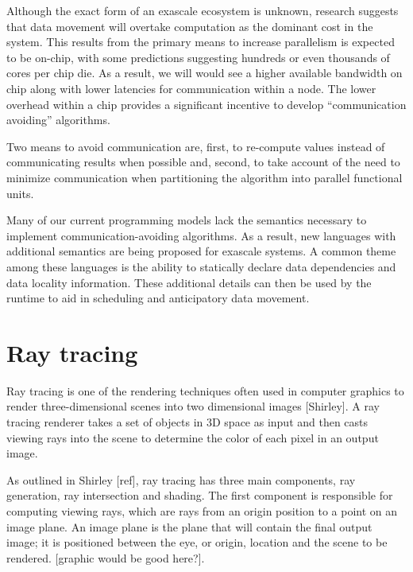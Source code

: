 Although the exact form of an exascale ecosystem is unknown, research
suggests that data movement will overtake computation as the dominant
cost in the system.
This results from the primary means to increase parallelism is
expected to be on-chip, with some predictions
suggesting hundreds or even thousands of cores
per chip die.
As a result, we will would see a higher available bandwidth on
chip along with lower latencies for communication within a node.
The
lower overhead within a chip provides a significant incentive to
develop ``communication avoiding'' algorithms.

Two means to avoid communication are, first, to re-compute values
instead of communicating results when possible and, second, to take
account of the need to minimize communication when partitioning the
algorithm into parallel functional units.

Many of our current programming models lack the semantics necessary to
implement communication-avoiding algorithms. As a result, new
languages with additional semantics are being proposed for exascale
systems. A common theme among these languages is the ability to
statically declare data dependencies and data locality information.
These additional details can then be used by the runtime to aid in
scheduling and anticipatory data movement.

\section{Ray tracing}
\label{sec:raytracing}

Ray tracing is one of the rendering techniques often used in computer graphics 
to render three-dimensional scenes into two dimensional images [Shirley].  
A ray tracing renderer takes a set of objects in 3D space as input and then 
casts viewing rays into the scene to determine the color of each pixel 
in an output image.  

As outlined in Shirley [ref], ray tracing has three main components, ray 
generation, ray intersection and shading.  The first component is responsible
for computing viewing rays, which are rays from an origin position to a point on 
an image plane.  An image plane is the plane that will contain the final output 
image; it is positioned between the eye, or origin, location and the scene to be 
rendered. [graphic would be good here?].

